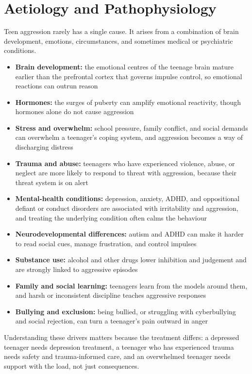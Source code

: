 \section*{Aetiology and Pathophysiology}
Teen aggression rarely has a single cause. It arises from a combination of brain development, emotions, circumstances, and sometimes medical or psychiatric conditions.

\begin{itemize}
    \item \textbf{Brain development:} the emotional centres of the teenage brain mature earlier than the prefrontal cortex that governs impulse control, so emotional reactions can outrun reason
    \item \textbf{Hormones:} the surges of puberty can amplify emotional reactivity, though hormones alone do not cause aggression
    \item \textbf{Stress and overwhelm:} school pressure, family conflict, and social demands can overwhelm a teenager's coping system, and aggression becomes a way of discharging distress
    \item \textbf{Trauma and abuse:} teenagers who have experienced violence, abuse, or neglect are more likely to respond to threat with aggression, because their threat system is on alert
    \item \textbf{Mental-health conditions:} depression, anxiety, ADHD, and oppositional defiant or conduct disorders are associated with irritability and aggression, and treating the underlying condition often calms the behaviour
    \item \textbf{Neurodevelopmental differences:} autism and ADHD can make it harder to read social cues, manage frustration, and control impulses
    \item \textbf{Substance use:} alcohol and other drugs lower inhibition and judgement and are strongly linked to aggressive episodes
    \item \textbf{Family and social learning:} teenagers learn from the models around them, and harsh or inconsistent discipline teaches aggressive responses
    \item \textbf{Bullying and exclusion:} being bullied, or struggling with cyberbullying and social rejection, can turn a teenager's pain outward in anger
\end{itemize}

Understanding these drivers matters because the treatment differs: a depressed teenager needs depression treatment, a teenager who has experienced trauma needs safety and trauma-informed care, and an overwhelmed teenager needs support with the load, not just consequences.

